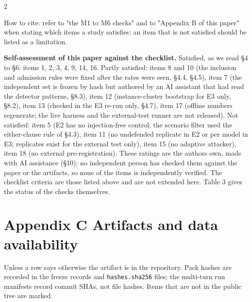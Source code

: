 \documentclass[9pt]{extarticle}
\begin{document}

\begin{multicols}{2}


How to cite: refer to "the M1 to M6 checks" and to "Appendix B of this paper" when stating which items a study satisfies; an item that is not satisfied should be listed as a limitation.

\textbf{Self-assessment of this paper against the checklist.} Satisfied, as we read §4 to §6: items 1, 2, 3, 4, 9, 14, 16. Partly satisfied: items 8 and 10 (the inclusion and admission rules were fixed after the rates were seen, §4.4, §4.5), item 7 (the independent set is frozen by hash but authored by an AI assistant that had read the detector patterns, §8.3), item 12 (instance-cluster bootstrap for E3 only, §8.2), item 13 (checked in the E3 re-run only, §4.7), item 17 (offline numbers regenerate; the live harness and the external-test runner are not released). Not satisfied: item 5 (E2 has no injection-free control; the scenario filter used the either-clause rule of §4.3), item 11 (no undefended replicate in E2 or per model in E3; replicates exist for the external test only), item 15 (no adaptive attacker), item 18 (no external pre-registration). These ratings are the authors\textquotesingle{} own, made with AI assistance (§10); no independent person has checked them against the paper or the artifacts, so none of the items is independently verified. The checklist criteria are those listed above and are not extended here. Table 3 gives the status of the checks themselves.

\section{Appendix C Artifacts and data availability}

Unless a row says otherwise the artifact is in the repository. Pack hashes are recorded in the freeze records and \texttt{hashes.sha256} files; the multi-turn run manifests record commit SHAs, not file hashes. Items that are not in the public tree are marked.


\end{multicols}

\end{document}
